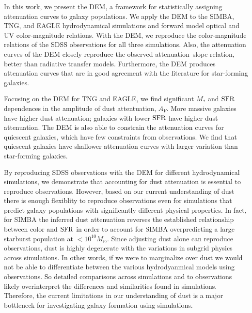 In this work, we present the DEM, a framework for statistically assigning
attenuation curves to galaxy populations. We apply the DEM to the SIMBA,
TNG, and EAGLE hydrodynamical simulations and forward model optical and UV
color-magnitude relations. %
With the DEM, we reproduce the color-magnitude relations of the SDSS
observations for all three simulations. Also, the attenuation curves of the DEM
closely reproduce the observed attenuation--slope relation, better than
radiative transfer models. Furthermore, the DEM produces attenuation curves
that are in good agreement with the literature for star-forming galaxies.

Focusing on the DEM for TNG and EAGLE, we find significant $M_*$ and ${\rm SFR}$
dependences in the amplitude of dust attentuation, $A_V$. More massive
galaxies have higher dust attenuation; galaxies with lower 
${\rm SFR}$ have  higher dust attenuation. The DEM is also able to constrain the
attenuation curves for quiescent galaxies, which have few constraints from
observations. We find that quiescent galaxies have shallower attenuation
curves with larger variation than star-forming galaxies.

By reproducing SDSS observations with the DEM for different hydrodynamical
simulations, we demonstrate that accounting for dust attenuation is essential 
to reproduce observations. However, based on our current understanding of dust
there is enough flexiblity to reproduce observations even for simulations that
predict galaxy populations with significantly different physical properties. 
In fact, for SIMBA the inferred dust attenuation reverses the established 
relationship between color and ${\rm SFR}$ in order to account for SIMBA
overpredicting a large starburst population at $<10^{10}M_\odot$. Since
adjusting dust alone can reproduce observations, dust is highly degenerate with the variations in
subgrid physics across simulations. In other words, if we were to marginalize
over dust we would not be able to differentiate between the various
hydrodyanmical models using observations. So detailed comparisons across
simulations and to observations likely overinterpret the differences and
similarities found in simulations. Therefore, the current limitations in our
understanding of dust is a major bottleneck for investigating galaxy formation
using simulations.



